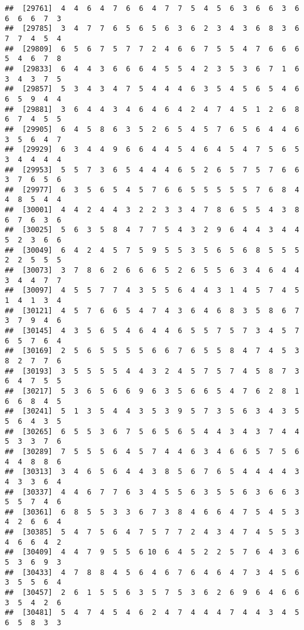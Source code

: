 \documentclass[
]{book}
\begin{document}
\begin{verbatim}
##  [29761]  4  4  6  4  7  6  6  4  7  7  5  4  5  6  3  6  6  3  6  6  6  6  7  3
##  [29785]  3  4  7  7  6  5  6  5  6  3  6  2  3  4  3  6  8  3  6  7  7  4  5  4
##  [29809]  6  5  6  7  5  7  7  2  4  6  6  7  5  5  4  7  6  6  6  5  4  6  7  8
##  [29833]  6  4  4  3  6  6  6  4  5  5  4  2  3  5  3  6  7  1  6  3  4  3  7  5
##  [29857]  5  3  4  3  4  7  5  4  4  4  6  3  5  4  5  6  5  4  6  6  5  9  4  4
##  [29881]  3  6  4  4  3  4  6  4  6  4  2  4  7  4  5  1  2  6  8  6  7  4  5  5
##  [29905]  6  4  5  8  6  3  5  2  6  5  4  5  7  6  5  6  4  4  6  3  5  6  4  7
##  [29929]  6  3  4  4  9  6  6  4  4  5  4  6  4  5  4  7  5  6  5  3  4  4  4  4
##  [29953]  5  5  7  3  6  5  4  4  4  6  5  2  6  5  7  5  7  6  6  3  7  6  5  6
##  [29977]  6  3  5  6  5  4  5  7  6  6  5  5  5  5  5  7  6  8  4  4  8  5  4  4
##  [30001]  4  4  2  4  4  3  2  2  3  3  4  7  8  6  5  5  4  3  8  6  7  6  3  6
##  [30025]  5  6  3  5  8  4  7  7  5  4  3  2  9  6  4  4  3  4  4  5  2  3  6  6
##  [30049]  6  4  2  4  5  7  5  9  5  5  3  5  6  5  6  8  5  5  5  2  2  5  5  5
##  [30073]  3  7  8  6  2  6  6  6  5  2  6  5  5  6  3  4  6  4  4  3  4  4  7  7
##  [30097]  4  5  5  7  7  4  3  5  5  6  4  4  3  1  4  5  7  4  5  1  4  1  3  4
##  [30121]  4  5  7  6  6  5  4  7  4  3  6  4  6  8  3  5  8  6  7  3  7  9  4  6
##  [30145]  4  3  5  6  5  4  6  4  4  6  5  5  7  5  7  3  4  5  7  6  5  7  6  4
##  [30169]  2  5  6  5  5  5  5  6  6  7  6  5  5  8  4  7  4  5  3  8  2  7  7  6
##  [30193]  3  5  5  5  5  4  4  3  2  4  5  7  5  7  4  5  8  7  3  6  4  7  5  5
##  [30217]  5  3  6  5  6  6  9  6  3  5  6  6  5  4  7  6  2  8  1  6  6  8  4  5
##  [30241]  5  1  3  5  4  4  3  5  3  9  5  7  3  5  6  3  4  3  5  5  6  4  3  5
##  [30265]  6  5  5  3  6  7  5  6  5  6  5  4  4  3  4  3  7  4  4  5  3  3  7  6
##  [30289]  7  5  5  5  6  4  5  7  4  4  6  3  4  6  6  5  7  5  6  4  4  8  8  6
##  [30313]  3  4  6  5  6  4  4  3  8  5  6  7  6  5  4  4  4  4  3  4  3  3  6  4
##  [30337]  4  4  6  7  7  6  3  4  5  5  6  3  5  5  6  3  6  6  3  5  5  7  4  6
##  [30361]  6  8  5  5  3  3  6  7  3  8  4  6  6  4  7  5  4  5  3  4  2  6  6  4
##  [30385]  5  4  7  5  6  4  7  5  7  7  2  4  3  4  7  4  5  5  3  4  6  6  4  2
##  [30409]  4  4  7  9  5  5  6 10  6  4  5  2  2  5  7  6  4  3  6  5  3  6  9  3
##  [30433]  4  7  8  8  4  5  6  4  6  7  6  4  6  4  7  3  4  5  6  3  5  5  6  4
##  [30457]  2  6  1  5  5  6  3  5  7  5  3  6  2  6  9  6  4  6  6  3  5  4  2  6
##  [30481]  5  4  7  4  5  4  6  2  4  7  4  4  4  7  4  4  3  4  5  6  5  8  3  3

\end{verbatim}
\end{document}
